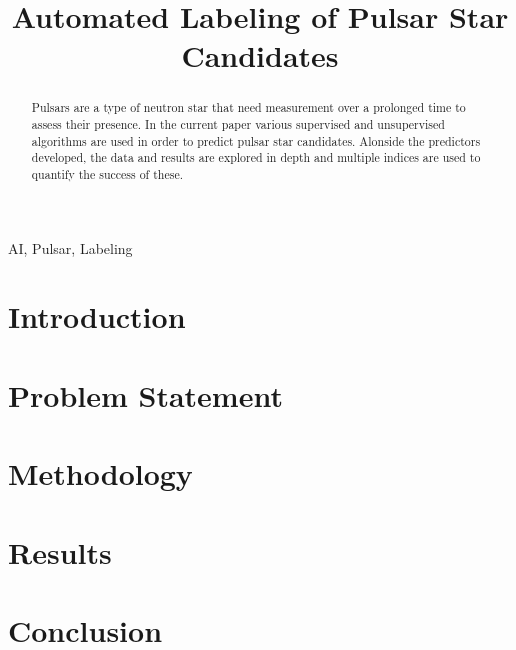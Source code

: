 \documentclass[journal]{IEEEtran}
\begin{document}
\title{Automated Labeling of Pulsar Star Candidates}

\author{
    }

\maketitle

\begin{abstract}
    Pulsars are a type of neutron star that need measurement over a prolonged
    time to assess their presence. In the current paper various supervised and
    unsupervised algorithms are used in order to predict pulsar star candidates.
    Alonside the predictors developed, the data and results are explored in
    depth and multiple indices are used to quantify the success of these.
\end{abstract}

\begin{IEEEkeywords}
    AI, Pulsar, Labeling
\end{IEEEkeywords}

\section{Introduction\label{sec:intro}} 


\section{Problem Statement\label{sec:problem}}


\section{Methodology\label{sec:methods}}


\section{Results\label{sec:results}}


\section{Conclusion\label{sec:conclusion}}


\printbibliography
\end{document}
